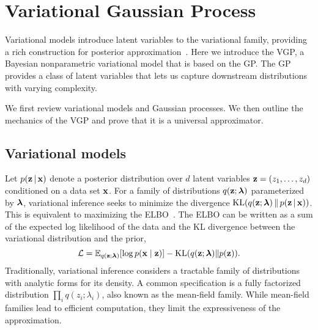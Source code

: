 
\section{Variational Gaussian Process}

Variational models introduce latent variables to the variational
family, providing a rich construction for posterior
approximation~\citep{ranganath2015hierarchical}.  Here we introduce
the \acrfull{VGP}, a Bayesian nonparametric variational model that is
based on the \acrlong{GP}.  The \gls{GP} provides a class of latent
variables that lets us capture downstream distributions with varying
complexity.

We first review variational models and Gaussian processes.  We then
outline the mechanics of the \gls{VGP} and prove that it is a
universal approximator.

\subsection{Variational models}
\label{sec:background}

Let $p(\boldsymbol{\mathbf{z}}\,|\,\boldsymbol{\mathbf{x}})$ denote a posterior distribution over $d$ latent
variables $\boldsymbol{\mathbf{z}}=(z_1,\ldots,z_d)$ conditioned on a data set
$\boldsymbol{\mathbf{x}}$. For a family of distributions $q(\boldsymbol{\mathbf{z}}; \boldsymbol{\mathbf{\lambda}})$
parameterized by $\boldsymbol{\mathbf{\lambda}}$, variational inference seeks to minimize
the divergence
$\operatorname{KL}(q(\boldsymbol{\mathbf{z}}; \boldsymbol{\mathbf{\lambda}})\,\|\, p(\boldsymbol{\mathbf{z}}\,|\,\boldsymbol{\mathbf{x}}))$.  This is
equivalent to maximizing the
\gls{ELBO}~\citep{wainwright2008graphical}.  The \gls{ELBO} can be
written as a sum of the expected log likelihood of the data and the KL
divergence between the variational distribution and the prior,
\begin{equation}
\label{eq:bound_autoencoder}
\mathcal{L} = \mathbb{E}_{q(\boldsymbol{\mathbf{z}}; \boldsymbol{\mathbf{\lambda}})}[\log p(\boldsymbol{\mathbf{x}}\mid\boldsymbol{\mathbf{z}})] -
\operatorname{KL}(q(\boldsymbol{\mathbf{z}}; \boldsymbol{\mathbf{\lambda}})\|p(\boldsymbol{\mathbf{z}})).
\end{equation}
Traditionally, variational inference considers a tractable family of
distributions with analytic forms for its density. A common
specification is a fully factorized distribution
$\prod_i q(z_i; \lambda_i)$, also known as the mean-field
family. While mean-field families lead to efficient computation,
they limit the expressiveness of the approximation.

